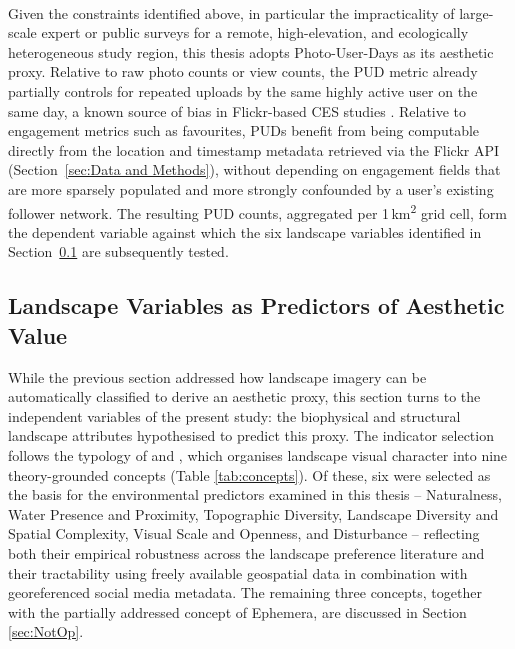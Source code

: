 \documentclass[hidelinks, 11pt]{article}
\begin{document}
\\
Given the constraints identified above, in particular the impracticality of large-scale expert or public surveys for a remote, high-elevation, and ecologically heterogeneous study region, this thesis adopts Photo-User-Days as its aesthetic proxy. Relative to raw photo counts or view counts, the PUD metric already partially controls for repeated uploads by the same highly active user on the same day, a known source of bias in Flickr-based CES studies \citep{wood_using_2013,ghermandi_geolocated_2022}. Relative to engagement metrics such as favourites, PUDs benefit from being computable directly from the location and timestamp metadata retrieved via the Flickr API (Section~\ref{sec:Data and Methods}), without depending on engagement fields that are more sparsely populated and more strongly confounded by a user's existing follower network. The resulting PUD counts, aggregated per 1\,km\textsuperscript{2} grid cell, form the dependent variable against which the six landscape variables identified in Section~\ref{sec:LI} are subsequently tested.


\subsection{Landscape Variables as Predictors of Aesthetic Value}\label{sec:LI}

While the previous section addressed how landscape imagery can be automatically classified to derive an aesthetic proxy, this section turns to the independent variables of the present study: the biophysical and structural landscape attributes hypothesised to predict this proxy. The indicator selection follows the typology of \citet{ode_capturing_2008} and \citet{tveit_key_2006}, which organises landscape visual character into nine theory-grounded concepts (Table \ref{tab:concepts}). Of these, six were selected as the basis for the environmental predictors examined in this thesis -- Naturalness, Water Presence and Proximity, Topographic Diversity, Landscape Diversity and Spatial Complexity, Visual Scale and Openness, and Disturbance -- reflecting both their empirical robustness across the landscape preference literature and their tractability using freely available geospatial data in combination with georeferenced social media metadata. The remaining three concepts, together with the partially addressed concept of Ephemera, are discussed in Section \ref{sec:NotOp}.
\end{document}
